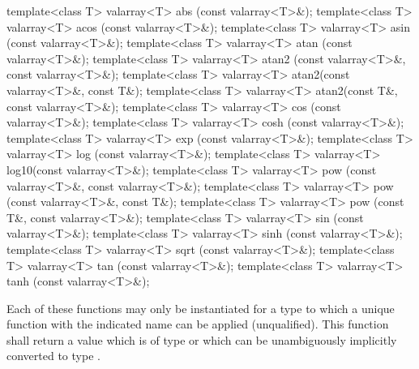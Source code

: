 %
%
%
%
%
%
%
%
%
%
%
%
%
%
%
%
\begin{itemdecl}
template<class T> valarray<T> abs  (const valarray<T>&);
template<class T> valarray<T> acos (const valarray<T>&);
template<class T> valarray<T> asin (const valarray<T>&);
template<class T> valarray<T> atan (const valarray<T>&);
template<class T> valarray<T> atan2
    (const valarray<T>&, const valarray<T>&);
template<class T> valarray<T> atan2(const valarray<T>&, const T&);
template<class T> valarray<T> atan2(const T&, const valarray<T>&);
template<class T> valarray<T> cos  (const valarray<T>&);
template<class T> valarray<T> cosh (const valarray<T>&);
template<class T> valarray<T> exp  (const valarray<T>&);
template<class T> valarray<T> log  (const valarray<T>&);
template<class T> valarray<T> log10(const valarray<T>&);
template<class T> valarray<T> pow
    (const valarray<T>&, const valarray<T>&);
template<class T> valarray<T> pow  (const valarray<T>&, const T&);
template<class T> valarray<T> pow  (const T&, const valarray<T>&);
template<class T> valarray<T> sin  (const valarray<T>&);
template<class T> valarray<T> sinh (const valarray<T>&);
template<class T> valarray<T> sqrt (const valarray<T>&);
template<class T> valarray<T> tan  (const valarray<T>&);
template<class T> valarray<T> tanh (const valarray<T>&);
\end{itemdecl}

\begin{itemdescr}
\pnum
Each of these functions may only be instantiated for a type 
to which a unique function with the indicated name can be applied (unqualified).
This function shall return a value which is of type 
or which can be unambiguously implicitly converted to type .
\end{itemdescr}

